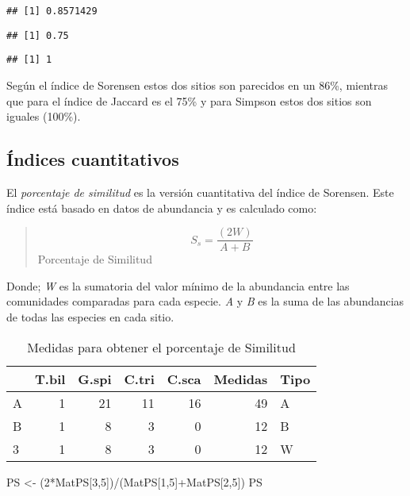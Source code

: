 \documentclass[
]{article}
\newenvironment{Shaded}{\begin{snugshade}}{\end{snugshade}}
\newcommand{\DecValTok}[1]{\textcolor[rgb]{0.00,0.00,0.81}{#1}}
\newcommand{\NormalTok}[1]{#1}
\newcommand{\OtherTok}[1]{\textcolor[rgb]{0.56,0.35,0.01}{#1}}
\newcommand{\SpecialCharTok}[1]{\textcolor[rgb]{0.00,0.00,0.00}{#1}}
\begin{document}
\begin{verbatim}
## [1] 0.8571429
\end{verbatim}

\begin{verbatim}
## [1] 0.75
\end{verbatim}

\begin{verbatim}
## [1] 1
\end{verbatim}

Según el índice de Sorensen estos dos sitios son parecidos en un 86\%, mientras que para el índice de Jaccard es el 75\% y para Simpson estos dos sitios son iguales (100\%).

\hypertarget{uxedndices-cuantitativos}{%
\subsection{Índices cuantitativos}\label{uxedndices-cuantitativos}}

El \emph{porcentaje de similitud} es la versión cuantitativa del índice de Sorensen. Este índice está basado en datos de abundancia y es calculado como:

\begin{quote}
\[S_s= \frac{(2W)}{A+B}\]
Porcentaje de Similitud
\end{quote}

Donde; \emph{W} es la sumatoria del valor mínimo de la abundancia entre las comunidades comparadas para cada especie. \emph{A} y \emph{B} es la suma de las abundancias de todas las especies en cada sitio.

\begin{table}

\caption{\label{tab:unnamed-chunk-4}Medidas para obtener el porcentaje de Similitud}
\centering
\begin{tabular}[t]{l|r|r|r|r|r|l}
\hline
  & T.bil & G.spi & C.tri & C.sca & Medidas & Tipo\\
\hline
A & 1 & 21 & 11 & 16 & 49 & A\\
\hline
B & 1 & 8 & 3 & 0 & 12 & B\\
\hline
3 & 1 & 8 & 3 & 0 & 12 & W\\
\hline
\end{tabular}
\end{table}

\begin{Shaded}
\begin{Highlighting}[]
\NormalTok{PS }\OtherTok{\textless{}{-}}\NormalTok{ (}\DecValTok{2}\SpecialCharTok{*}\NormalTok{MatPS[}\DecValTok{3}\NormalTok{,}\DecValTok{5}\NormalTok{])}\SpecialCharTok{/}\NormalTok{(MatPS[}\DecValTok{1}\NormalTok{,}\DecValTok{5}\NormalTok{]}\SpecialCharTok{+}\NormalTok{MatPS[}\DecValTok{2}\NormalTok{,}\DecValTok{5}\NormalTok{])}
\NormalTok{PS}
\end{Highlighting}
\end{Shaded}
\end{document}
